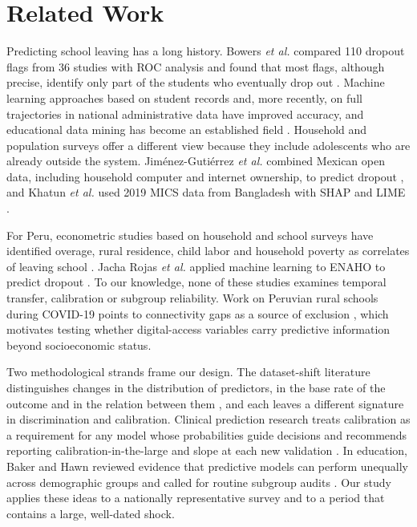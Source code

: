 \documentclass[conference]{IEEEtran}
\begin{document}
\section{Related Work}

Predicting school leaving has a long history. Bowers \textit{et al.} compared 110 dropout flags from 36 studies with ROC analysis and found that most flags, although precise, identify only part of the students who eventually drop out \cite{bowers2013}. Machine learning approaches based on student records \cite{lakkaraju2015,sansone2019} and, more recently, on full trajectories in national administrative data \cite{rodriguez2023} have improved accuracy, and educational data mining has become an established field \cite{romero2020}. Household and population surveys offer a different view because they include adolescents who are already outside the system. Jim\'enez-Guti\'errez \textit{et al.} combined Mexican open data, including household computer and internet ownership, to predict dropout \cite{jimenez2024}, and Khatun \textit{et al.} used 2019 MICS data from Bangladesh with SHAP and LIME \cite{khatun2025}.

For Peru, econometric studies based on household and school surveys have identified overage, rural residence, child labor and household poverty as correlates of leaving school \cite{cavero2011,alcazar2009}. Jacha Rojas \textit{et al.} applied machine learning to ENAHO to predict dropout \cite{jacha2024}. To our knowledge, none of these studies examines temporal transfer, calibration or subgroup reliability. Work on Peruvian rural schools during COVID-19 points to connectivity gaps as a source of exclusion \cite{anaya2021}, which motivates testing whether digital-access variables carry predictive information beyond socioeconomic status.

Two methodological strands frame our design. The dataset-shift literature distinguishes changes in the distribution of predictors, in the base rate of the outcome and in the relation between them \cite{moreno2012}, and each leaves a different signature in discrimination and calibration. Clinical prediction research treats calibration as a requirement for any model whose probabilities guide decisions and recommends reporting calibration-in-the-large and slope at each new validation \cite{vancalster2019}. In education, Baker and Hawn reviewed evidence that predictive models can perform unequally across demographic groups and called for routine subgroup audits \cite{baker2022}. Our study applies these ideas to a nationally representative survey and to a period that contains a large, well-dated shock.
\end{document}
